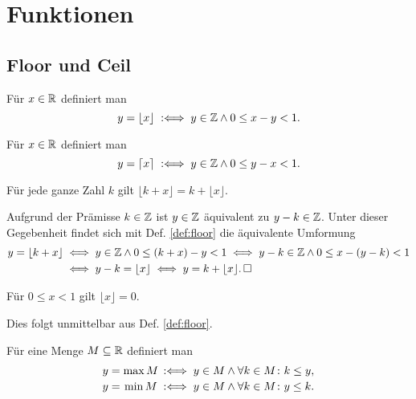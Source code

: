 \section{Funktionen}

\subsection{Floor und Ceil}

\begin{Definition}[Floorfunktion]%
\label{def:floor}
Für $x\in\mathbb R$ definiert man
\[y = \lfloor x\rfloor\;:\Longleftrightarrow\; y\in\mathbb Z\land 0\le x-y < 1.\]
\end{Definition}

\begin{Definition}[Ceilfunktion]%
\label{def:ceil}
Für $x\in\mathbb R$ definiert man
\[y = \lceil x\rceil\;:\Longleftrightarrow\; y\in\mathbb Z\land 0\le y-x < 1.\]
\end{Definition}

\begin{Satz}\label{floor-add-int}
Für jede ganze Zahl $k$ gilt $\lfloor k + x\rfloor = k + \lfloor x\rfloor$.
\end{Satz}
\begin{Beweis} Aufgrund der Prämisse $k\in\mathbb Z$ ist $y\in\mathbb Z$ äquivalent
zu $y-k\in\mathbb Z$. Unter dieser Gegebenheit findet sich mit
Def. \ref{def:floor} die äquivalente Umformung
\begin{align*}
y = \lfloor k+x\rfloor &\iff y\in\mathbb Z\land 0\le (k+x)-y < 1\iff y-k\in\mathbb Z\land 0\le x-(y-k) < 1\\
&\iff y - k = \lfloor x\rfloor \iff y = k + \lfloor x\rfloor.\,\square
\end{align*}
\end{Beweis}

\begin{Satz}\label{floor-is-zero}
Für $0\le x < 1$ gilt $\lfloor x\rfloor = 0$.
\end{Satz}
\begin{Beweis}
Dies folgt unmittelbar aus Def. \ref{def:floor}.\,\qedsymbol
\end{Beweis}

\newpage
\begin{Definition}\label{def:max-min}\newlinefirst
Für eine Menge $M\subseteq\mathbb R$ definiert man
\[\begin{array}{@{}l@{\;}c@{\,}l@{}}
y =& \max M &\defiff y\in M\land\forall k\in M\colon k\le y,\\[2pt]
y =& \min M &\defiff y\in M\land\forall k\in M\colon y\le k.
\end{array}\]
\end{Definition}

